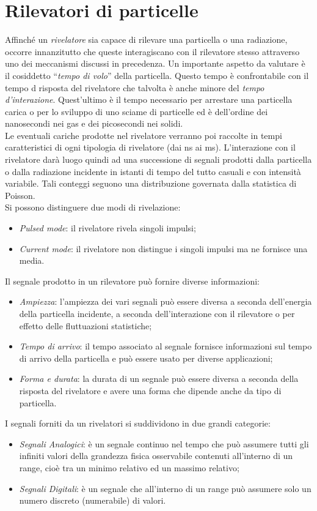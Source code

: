 \documentclass[12pt, letterpaper]{book}
\begin{document}
\chapter{Rilevatori di particelle}
Affinché un \textit{rivelatore} sia capace di rilevare una particella o una radiazione, occorre innanzitutto che queste interagiscano con il rilevatore stesso attraverso uno dei meccanismi discussi in
precedenza. Un importante aspetto da valutare è il cosiddetto “\textit{tempo di volo}” della particella.
Questo tempo è confrontabile con il tempo d risposta del rivelatore che talvolta è anche minore del \textit{tempo d'interazione}. Quest'ultimo è il tempo necessario per arrestare una particella carica o per lo sviluppo di uno sciame di particelle ed è dell'ordine dei nanosecondi nei gas e dei picosecondi nei solidi.\\
Le eventuali cariche prodotte nel rivelatore verranno poi raccolte in tempi caratteristici di ogni tipologia di rivelatore (dai ns ai ms).
L'interazione con il rivelatore darà luogo quindi ad una successione di segnali prodotti dalla particella o dalla radiazione incidente in istanti di tempo del tutto casuali e con intensità variabile.
Tali conteggi seguono una distribuzione governata dalla statistica di Poisson.\\
Si possono distinguere due modi di rivelazione:
\begin{itemize}
    \item \textit{Pulsed mode}: il rivelatore rivela singoli impulsi;
    \item \textit{Current mode}: il rivelatore non distingue i singoli impulsi ma ne fornisce una media.
\end{itemize}
Il segnale prodotto in un rilevatore può fornire diverse informazioni:
\begin{itemize}
    \item \textit{Ampiezza}: l'ampiezza dei vari segnali può essere diversa a seconda dell'energia della particella incidente, a seconda dell'interazione con il rilevatore o per effetto delle fluttuazioni statistiche;
    \item \textit{Tempo di arrivo}: il tempo associato al segnale fornisce informazioni sul tempo di arrivo della particella e può essere usato per diverse applicazioni;
    \item \textit{Forma e durata}: la durata di un segnale può essere diversa a seconda della risposta del rivelatore e avere una forma che dipende anche da tipo di particella.
\end{itemize}
I segnali forniti da un rivelatori si suddividono in due grandi categorie:
\begin{itemize}
    \item \textit{Segnali Analogici}: è un segnale continuo nel tempo che può assumere tutti gli infiniti valori della grandezza fisica osservabile contenuti all'interno di un range, cioè tra un minimo relativo ed un massimo relativo;
    \item \textit{Segnali Digitali}: è un segnale che all'interno di un range può assumere solo un numero discreto (numerabile) di valori.
\end{itemize}
\end{document}
